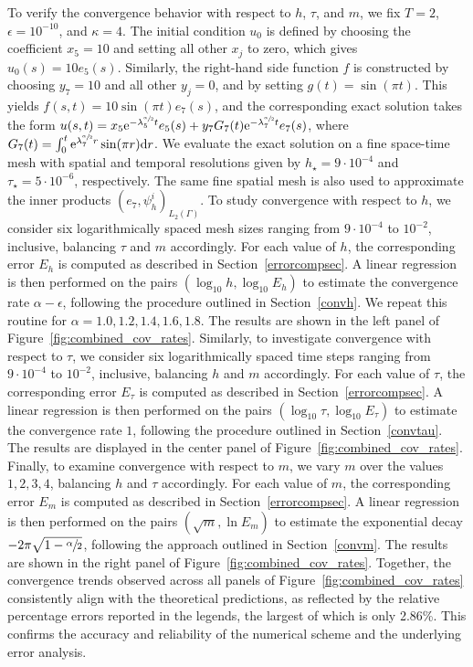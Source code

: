 \documentclass[numbers,webpdf]{ima-authoring-template}%
\theoremstyle{thmstyletwo}%
\numberwithin{equation}{section}
\begin{document}
To verify the convergence behavior with respect to $h$, $\tau$, and $m$, we fix $T = 2$, $\epsilon =  10^{-10}$, and $\kappa = 4$. The initial condition $u_0$ is defined by choosing the coefficient $x_5=10$ and setting all other $x_j$ to zero, which gives $u_0(s) = 10e_5(s)$. Similarly, the right-hand side function $f$ is constructed by choosing $y_7=10$ and all other $y_j=0$, and by setting $g(t)=\sin(\pi t)$. This yields $f(s,t) = 10\sin(\pi t)e_7(s)$, and the corresponding exact solution takes the form $u(s,t) = x_5\mathrm{e}^{-\lambda^{\sfrac{\alpha}{2}}_5t}e_5(s)+y_7 G_7(t)\mathrm{e}^{-\lambda^{\sfrac{\alpha}{2}}_7t}e_7(s)$, where $G_7(t)= \int_0^t \mathrm{e}^{\lambda^{\sfrac{\alpha}{2}}_7r}\sin(\pi r)\dd r$. We evaluate the exact solution on a fine space-time mesh with spatial and temporal resolutions given by $h_{\star} = 9\cdot10^{-4}$ and $\tau_{\star} = 5\cdot10^{-6}$, respectively. The same fine spatial mesh is also used to approximate the inner products $(e_7, \psi^i_h)_{L_2(\Gamma)}$. To study convergence with respect to $h$, we consider six logarithmically spaced mesh sizes ranging from $9\cdot10^{-4}$ to $10^{-2}$, inclusive, balancing $\tau$ and $m$ accordingly. For each value of $h$, the corresponding error $E_h$ is computed as described in Section~\ref{errorcompsec}. A linear regression is then performed on the pairs $(\log_{10} h, \log_{10} E_h)$ to estimate the convergence rate $\alpha-\epsilon$, following the procedure outlined in Section~\ref{convh}. We repeat this routine for $\alpha = 1.0,1.2,1.4,1.6,1.8$. The results are shown in the left panel of Figure~\ref{fig:combined_cov_rates}. Similarly, to investigate convergence with respect to $\tau$, we consider six logarithmically spaced time steps ranging from $9\cdot10^{-4}$ to $10^{-2}$, inclusive, balancing $h$ and $m$ accordingly. For each value of $\tau$, the corresponding error $E_\tau$ is computed as described in Section~\ref{errorcompsec}. A linear regression is then performed on the pairs $(\log_{10} \tau, \log_{10} E_\tau)$ to estimate the convergence rate $1$, following the procedure outlined in Section~\ref{convtau}. The results are displayed in the center panel of Figure~\ref{fig:combined_cov_rates}. Finally, to examine convergence with respect to $m$, we vary $m$ over the values $1, 2, 3, 4$, balancing $h$ and $\tau$ accordingly. For each value of $m$, the corresponding error $E_m$ is computed as described in Section~\ref{errorcompsec}. A linear regression is then performed on the pairs $(\sqrt{m}, \ln E_m)$ to estimate the exponential decay $-2\pi\sqrt{1-\sfrac{\alpha}{2}}$, following the approach outlined in Section~\ref{convm}. The results are shown in the right panel of Figure~\ref{fig:combined_cov_rates}. Together, the convergence trends observed across all panels of Figure~\ref{fig:combined_cov_rates} consistently align with the theoretical predictions, as reflected by the relative percentage errors reported in the legends, the largest of which is only 2.86\%. This confirms the accuracy and reliability of the numerical scheme and the underlying error analysis.
\end{document}
